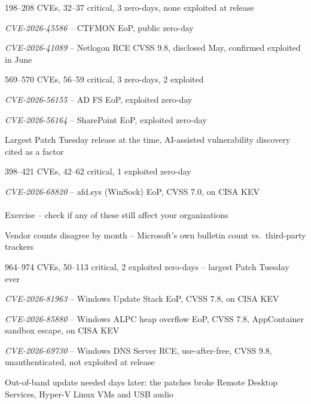 \documentclass[Screen16to9,17pt]{foils}
\begin{document}
\begin{list2}
\item 198--208 CVEs, 32--37 critical, 3 zero-days, none exploited at release
\item \emph{CVE-2026-45586} -- CTFMON EoP, public zero-day
\item \emph{CVE-2026-41089} -- Netlogon RCE CVSS 9.8, disclosed May, confirmed exploited in June
\end{list2}

\begin{list2}
\item 569--570 CVEs, 56--59 critical, 3 zero-days, 2 exploited
\item \emph{CVE-2026-56155} -- AD FS EoP, exploited zero-day
\item \emph{CVE-2026-56164} -- SharePoint EoP, exploited zero-day
\item Largest Patch Tuesday release at the time, AI-assisted vulnerability discovery cited as a factor
\end{list2}

\begin{list2}
\item 398--421 CVEs, 42--62 critical, 1 exploited zero-day
\item \emph{CVE-2026-68820} -- afd.sys (WinSock) EoP, CVSS 7.0, on CISA KEV\\
\\
Exercise -- check if any of these still affect your organizations
\item Vendor counts disagree by month -- Microsoft's own bulletin count vs.\ third-party trackers
\end{list2}

\begin{list2}
\item 964--974 CVEs, 50--113 critical, 2 exploited zero-days -- largest Patch Tuesday ever
\item \emph{CVE-2026-81963} -- Windows Update Stack EoP, CVSS 7.8, on CISA KEV
\item \emph{CVE-2026-85880} -- Windows ALPC heap overflow EoP, CVSS 7.8, AppContainer sandbox escape, on CISA KEV
\item \emph{CVE-2026-69730} -- Windows DNS Server RCE, use-after-free, CVSS 9.8, unauthenticated, not exploited at release\\
\item Out-of-band update needed days later: the patches broke Remote Desktop Services, Hyper-V Linux VMs and USB audio
\end{list2}
\end{document}
